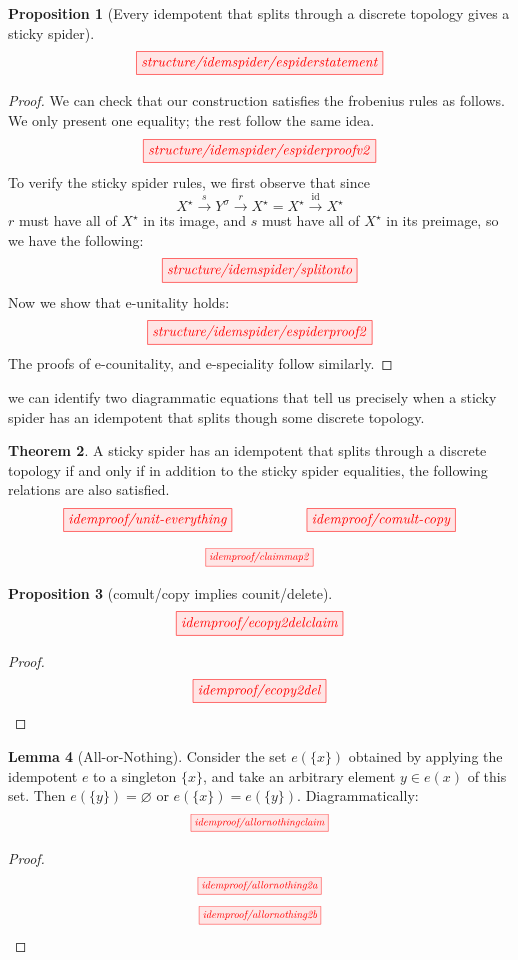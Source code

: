 \documentclass{tufte-handout}
\theoremstyle{definition}
\newtheorem{theorem}{Theorem}[section]
\newtheorem{lemma}[theorem]{Lemma}
\newtheorem{proposition}[theorem]{Proposition}
\begin{document}
\begin{fullwidth}
\begin{proposition}[Every idempotent that splits through a discrete topology gives a sticky spider]\label{prop:splitmeanssticky}
\[\scalebox{1}{\tikzfig{structure/idemspider/espiderstatement}}\]
\begin{proof}
We can check that our construction satisfies the frobenius rules as follows. We only present one equality; the rest follow the same idea.
\[\scalebox{1}{\tikzfig{structure/idemspider/espiderproofv2}}\]
To verify the sticky spider rules, we first observe that since \[X^\star \overset{s}{\rightarrow} Y^\sigma \overset{r}{\rightarrow} X^\star = X^\star \overset{\mathop{id}}{\rightarrow} X^\star\]
$r$ must have all of $X^\star$ in its image, and $s$ must have all of $X^\star$ in its preimage, so we have the following:
\[\scalebox{1}{\tikzfig{structure/idemspider/splitonto}}\]
Now we show that e-unitality holds:
\[\scalebox{1}{\tikzfig{structure/idemspider/espiderproof2}}\]
The proofs of e-counitality, and e-speciality follow similarly.
\end{proof}
\end{proposition}

 we can identify two diagrammatic equations that tell us precisely when a sticky spider has an idempotent that splits though some discrete topology.

\begin{theorem}\label{thm:stickygraphical}
A sticky spider has an idempotent that splits through a discrete topology if and only if in addition to the sticky spider equalities, the following relations are also satisfied.
\[\scalebox{1}{\tikzfig{idemproof/unit-everything}} \quad\quad\quad\quad \scalebox{1}{\tikzfig{idemproof/comult-copy}}\]
\end{theorem}

\[\scalebox{0.75}{\tikzfig{idemproof/claimmap2}}\]

\begin{proposition}[comult/copy implies counit/delete]\label{prop:counitdelete}
\[\scalebox{1}{\tikzfig{idemproof/ecopy2delclaim}}\]
\begin{proof}
\[\scalebox{1}{\tikzfig{idemproof/ecopy2del}}\]
\end{proof}
\end{proposition}

\newpage
\begin{lemma}[All-or-Nothing]\label{lem:allornothing}
Consider the set $e(\{x\})$ obtained by applying the idempotent $e$ to a singleton $\{x\}$, and take an arbitrary element $y \in e(x)$ of this set. Then $e(\{y\}) = \varnothing$ or $e(\{x\}) = e(\{y\})$. Diagrammatically: \[\scalebox{0.75}{\tikzfig{idemproof/allornothingclaim}}\]
\begin{proof}
\[\scalebox{0.75}{\tikzfig{idemproof/allornothing2a}}\]
\[\scalebox{0.75}{\tikzfig{idemproof/allornothing2b}}\]
\end{proof}
\end{lemma}


\end{fullwidth}
\end{document}
